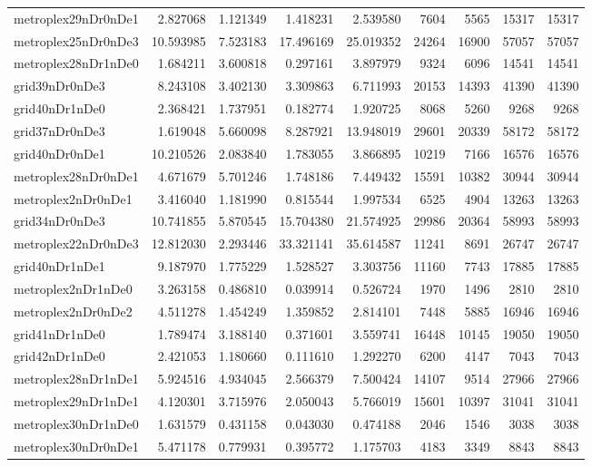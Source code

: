 \begin{longtable}{|l|r|r|r|r|r|r|r|r|}
metroplex29nDr0nDe1 & 2.827068 & 1.121349 & 1.418231 & 2.539580 & 7604 & 5565 & 15317 & 15317 \\
metroplex25nDr0nDe3 & 10.593985 & 7.523183 & 17.496169 & 25.019352 & 24264 & 16900 & 57057 & 57057 \\
metroplex28nDr1nDe0 & 1.684211 & 3.600818 & 0.297161 & 3.897979 & 9324 & 6096 & 14541 & 14541 \\
grid39nDr0nDe3 & 8.243108 & 3.402130 & 3.309863 & 6.711993 & 20153 & 14393 & 41390 & 41390 \\
grid40nDr1nDe0 & 2.368421 & 1.737951 & 0.182774 & 1.920725 & 8068 & 5260 & 9268 & 9268 \\
grid37nDr0nDe3 & 1.619048 & 5.660098 & 8.287921 & 13.948019 & 29601 & 20339 & 58172 & 58172 \\
grid40nDr0nDe1 & 10.210526 & 2.083840 & 1.783055 & 3.866895 & 10219 & 7166 & 16576 & 16576 \\
metroplex28nDr0nDe1 & 4.671679 & 5.701246 & 1.748186 & 7.449432 & 15591 & 10382 & 30944 & 30944 \\
metroplex2nDr0nDe1 & 3.416040 & 1.181990 & 0.815544 & 1.997534 & 6525 & 4904 & 13263 & 13263 \\
grid34nDr0nDe3 & 10.741855 & 5.870545 & 15.704380 & 21.574925 & 29986 & 20364 & 58993 & 58993 \\
metroplex22nDr0nDe3 & 12.812030 & 2.293446 & 33.321141 & 35.614587 & 11241 & 8691 & 26747 & 26747 \\
grid40nDr1nDe1 & 9.187970 & 1.775229 & 1.528527 & 3.303756 & 11160 & 7743 & 17885 & 17885 \\
metroplex2nDr1nDe0 & 3.263158 & 0.486810 & 0.039914 & 0.526724 & 1970 & 1496 & 2810 & 2810 \\
metroplex2nDr0nDe2 & 4.511278 & 1.454249 & 1.359852 & 2.814101 & 7448 & 5885 & 16946 & 16946 \\
grid41nDr1nDe0 & 1.789474 & 3.188140 & 0.371601 & 3.559741 & 16448 & 10145 & 19050 & 19050 \\
grid42nDr1nDe0 & 2.421053 & 1.180660 & 0.111610 & 1.292270 & 6200 & 4147 & 7043 & 7043 \\
metroplex28nDr1nDe1 & 5.924516 & 4.934045 & 2.566379 & 7.500424 & 14107 & 9514 & 27966 & 27966 \\
metroplex29nDr1nDe1 & 4.120301 & 3.715976 & 2.050043 & 5.766019 & 15601 & 10397 & 31041 & 31041 \\
metroplex30nDr1nDe0 & 1.631579 & 0.431158 & 0.043030 & 0.474188 & 2046 & 1546 & 3038 & 3038 \\
metroplex30nDr0nDe1 & 5.471178 & 0.779931 & 0.395772 & 1.175703 & 4183 & 3349 & 8843 & 8843 \\

\end{longtable}
